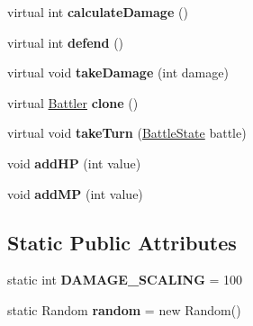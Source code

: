 \begin{DoxyCompactItemize}
\item 
\hypertarget{class_simple_r_p_g_1_1_battler_a5a12026c4a85de2f20d568f183692f3e}{virtual int {\bfseries calculate\+Damage} ()}\label{class_simple_r_p_g_1_1_battler_a5a12026c4a85de2f20d568f183692f3e}

\item 
\hypertarget{class_simple_r_p_g_1_1_battler_abb9370052205c7cd49dd0865b83dadae}{virtual int {\bfseries defend} ()}\label{class_simple_r_p_g_1_1_battler_abb9370052205c7cd49dd0865b83dadae}

\item 
\hypertarget{class_simple_r_p_g_1_1_battler_a6afb1d99fc531bbbb9396e1205be1bed}{virtual void {\bfseries take\+Damage} (int damage)}\label{class_simple_r_p_g_1_1_battler_a6afb1d99fc531bbbb9396e1205be1bed}

\item 
\hypertarget{class_simple_r_p_g_1_1_battler_aef46defbbb8c811f13c707099c3c8d4e}{virtual \hyperlink{class_simple_r_p_g_1_1_battler}{Battler} {\bfseries clone} ()}\label{class_simple_r_p_g_1_1_battler_aef46defbbb8c811f13c707099c3c8d4e}

\item 
\hypertarget{class_simple_r_p_g_1_1_battler_a92d63f259fbe5c79c7996db0744b8899}{virtual void {\bfseries take\+Turn} (\hyperlink{class_simple_r_p_g_1_1_states_1_1_battle_state}{Battle\+State} battle)}\label{class_simple_r_p_g_1_1_battler_a92d63f259fbe5c79c7996db0744b8899}

\item 
\hypertarget{class_simple_r_p_g_1_1_battler_a16434bead1bd62952eb74abc1be34863}{void {\bfseries add\+H\+P} (int value)}\label{class_simple_r_p_g_1_1_battler_a16434bead1bd62952eb74abc1be34863}

\item 
\hypertarget{class_simple_r_p_g_1_1_battler_a6b8fcc1465942de295cf4d181f752048}{void {\bfseries add\+M\+P} (int value)}\label{class_simple_r_p_g_1_1_battler_a6b8fcc1465942de295cf4d181f752048}

\end{DoxyCompactItemize}
\subsection*{Static Public Attributes}
\begin{DoxyCompactItemize}
\item 
\hypertarget{class_simple_r_p_g_1_1_battler_ac83c439f26bd3abe3dcaa24d231bbfdc}{static int {\bfseries D\+A\+M\+A\+G\+E\+\_\+\+S\+C\+A\+L\+I\+N\+G} = 100}\label{class_simple_r_p_g_1_1_battler_ac83c439f26bd3abe3dcaa24d231bbfdc}

\item 
\hypertarget{class_simple_r_p_g_1_1_battler_a65a28ffcf2263397e640d77784652df3}{static Random {\bfseries random} = new Random()}\label{class_simple_r_p_g_1_1_battler_a65a28ffcf2263397e640d77784652df3}

\end{DoxyCompactItemize}
